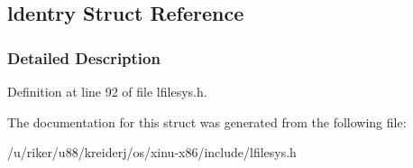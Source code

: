 \hypertarget{structldentry}{}\subsection{ldentry Struct Reference}
\label{structldentry}


\subsubsection{Detailed Description}


Definition at line 92 of file lfilesys.\+h.



The documentation for this struct was generated from the following file\+:\begin{DoxyCompactItemize}
\item 
/u/riker/u88/kreiderj/os/xinu-\/x86/include/lfilesys.\+h\end{DoxyCompactItemize}
